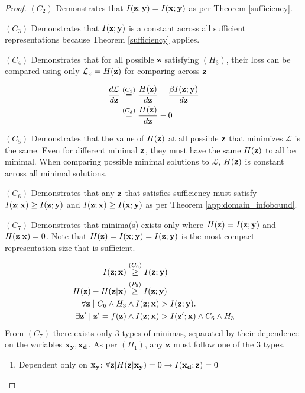\begin{theorem}
\begin{proof}
$(C_2)$ Demonstrates that $I({\mathbf{z}}; {\mathbf{y}}) = I({\mathbf{x}}; {\mathbf{y}})$ as per Theorem \ref{sufficiency}.

$(C_3)$ Demonstrates that $I({\mathbf{z}}; {\mathbf{y}})$ is a constant across all sufficient representations because Theorem \ref{sufficiency} applies.

$(C_4)$ Demonstrates that for all possible ${\mathbf{z}}$ satisfying $(H_3)$, their loss can be compared using only $\mathcal{L}_z = H({\mathbf{z}})$ for comparing across ${\mathbf{z}}$

$$
\begin{aligned}
    \frac{d\mathcal{L}}{d{\mathbf{z}}}  &\stackrel{\left(C_1\right)}{=}\frac{H({\mathbf{z}})}{d{\mathbf{z}}} - \frac{\beta I({\mathbf{z}}; {\mathbf{y}})}{d{\mathbf{z}}} \\
&\stackrel{\left(C_3\right)}{=}\frac{H({\mathbf{z}})}{d{\mathbf{z}}} - 0
\end{aligned}
$$

$(C_5)$ Demonstrates that the value of $H({\mathbf{z}})$ at all possible ${\mathbf{z}}$ that minimizes $\mathcal{L}$ is the same. Even for different minimal ${\mathbf{z}}$, they must have the same $H({\mathbf{z}})$ to all be minimal. When comparing possible minimal solutions to $\mathcal{L}$, $H({\mathbf{z}})$ is constant across all minimal solutions.

$(C_6)$ Demonstrates that any ${\mathbf{z}}$ that satisfies sufficiency must satisfy $I({\mathbf{z}}; {\mathbf{x}}) \geq I({\mathbf{z}}; {\mathbf{y}})$ and $I({\mathbf{z}}; {\mathbf{x}}) \geq I({\mathbf{x}}; {\mathbf{y}})$ as per Theorem \ref{app:domain_infobound}.

$(C_7)$ Demonstrates that minima(s) exists only where $H({\mathbf{z}}) = I({\mathbf{z}}; {\mathbf{y}})$ and $H({\mathbf{z}}| {\mathbf{x}}) = 0$. Note that $H({\mathbf{z}}) = I({\mathbf{x}}; {\mathbf{y}}) = I({\mathbf{z}}; {\mathbf{y}})$ is the most compact representation size that is sufficient.

$$
\begin{aligned}
    I({\mathbf{z}};{\mathbf{x}}) &\stackrel{\left(C_6\right)}{\geq} I({\mathbf{z}}; {\mathbf{y}}) \\
    H({\mathbf{z}}) - H({\mathbf{z}}| {\mathbf{x}})  &\stackrel{\left(P_5\right)}{\geq} I({\mathbf{z}}; {\mathbf{y}})\\
    \forall {\mathbf{z}}\mid C_6 \land H_3 &\land I({\mathbf{z}}; {\mathbf{x}}) > I({\mathbf{z}}; {\mathbf{y}}) . \\
    \exists {\mathbf{z}}' \mid {\mathbf{z}}' = f({\mathbf{z}}) &\land I({\mathbf{z}}; {\mathbf{x}}) > I({\mathbf{z}}'; {\mathbf{x}}) \land C_6 \land H_3
\end{aligned}
$$
From $(C_7)$ there exists only 3 types of minimas, separated by their dependence on the variables  ${\mathbf{x}}_{\mathbf{y}}, {\mathbf{x}}_{\mathbf{d}}$. As per $(H_1)$, any ${\mathbf{z}}$ must follow one of the 3 types.

\begin{enumerate}
    \item Dependent only on ${\mathbf{x}}_{\mathbf{y}}$: $\forall {\mathbf{z}}|H({\mathbf{z}}|{\mathbf{x}}_{\mathbf{y}})=0 \rightarrow I({\mathbf{x}}_{\mathbf{d}}; {\mathbf{z}}) = 0$


\end{enumerate}
\end{proof}
\end{theorem}
